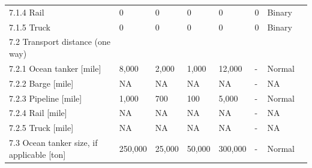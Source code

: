 \documentclass[11pt]{report}
\begin{document}
\begin{landscape}
\begin{scriptsize}
\begin{supertabular*}{1\columnwidth}{p{0.4\columnwidth}p{0.09\columnwidth}p{0.05\columnwidth}p{0.05\columnwidth}p{0.05\columnwidth}p{0.05\columnwidth}p{0.05\columnwidth}p{0.1\columnwidth}}
7.1.4   Rail                                                                                                                                                   & 0        & 0          & 0         & 0          & 0                  & Binary            \\
7.1.5   Truck                                                                                                                                                  & 0        & 0          & 0         & 0          & 0                  & Binary            \\
7.2   Transport distance (one way)                                                                                                                             &          &            &           &            &                    &                   \\
7.2.1   Ocean tanker {[}mile{]}                                                                                                                                & 8,000    & 2,000      & 1,000     & 12,000     & -                  & Normal            \\
7.2.2   Barge {[}mile{]}                                                                                                                                       & NA       & NA         & NA        & NA         & -                  & NA                \\
7.2.3   Pipeline {[}mile{]}                                                                                                                                    & 1,000    & 700        & 100       & 5,000      & -                  & Normal            \\
7.2.4   Rail {[}mile{]}                                                                                                                                        & NA       & NA         & NA        & NA         & -                  & NA                \\
7.2.5  Truck {[}mile{]}                                                                                                                                        & NA       & NA         & NA        & NA         & -                  & NA                \\
7.3   Ocean tanker size, if applicable {[}ton{]}                                                                                                               & 250,000  & 25,000     & 50,000    & 300,000    & -                  & Normal            \\

\end{supertabular*}
\end{scriptsize}
\end{landscape}
\end{document}

